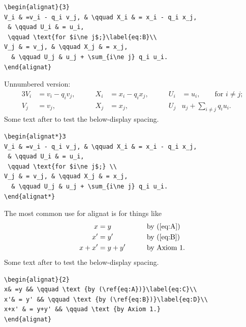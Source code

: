 \documentclass{article}
\newcommand{\ntt}{\normalfont\ttfamily}
\newcommand{\env}[1]{{\protect\ntt#1}}
\theoremstyle{definition}
\theoremstyle{remark}
\begin{document}
\begin{verbatim}
\begin{alignat}{3}
V_i & =v_i - q_i v_j, & \qquad X_i & = x_i - q_i x_j,
 & \qquad U_i & = u_i,
 \qquad \text{for $i\ne j$;}\label{eq:B}\\
V_j & = v_j, & \qquad X_j & = x_j,
  & \qquad U_j & u_j + \sum_{i\ne j} q_i u_i.
\end{alignat}
\end{verbatim}

Unnumbered version:
\begin{alignat*}3
V_i & =v_i - q_i v_j, & \qquad X_i & = x_i - q_i x_j,
 & \qquad U_i & = u_i,
 \qquad \text{for $i\ne j$;} \\
V_j & = v_j, & \qquad X_j & = x_j,
  & \qquad U_j & u_j + \sum_{i\ne j} q_i u_i.
\end{alignat*}
Some text after to test the below-display spacing.

\begin{verbatim}
\begin{alignat*}3
V_i & =v_i - q_i v_j, & \qquad X_i & = x_i - q_i x_j,
 & \qquad U_i & = u_i,
 \qquad \text{for $i\ne j$;} \\
V_j & = v_j, & \qquad X_j & = x_j,
  & \qquad U_j & u_j + \sum_{i\ne j} q_i u_i.
\end{alignat*}
\end{verbatim}

\newpage
The most common use for \env{alignat} is for things like
\begin{alignat}{2}
x& =y && \qquad \text {by (\ref{eq:A})}\label{eq:C}\\
x'& = y' && \qquad \text {by (\ref{eq:B})}\label{eq:D}\\
x+x' & = y+y' && \qquad \text {by Axiom 1.}
\end{alignat}
Some text after to test the below-display spacing.

\begin{verbatim}
\begin{alignat}{2}
x& =y && \qquad \text {by (\ref{eq:A})}\label{eq:C}\\
x'& = y' && \qquad \text {by (\ref{eq:B})}\label{eq:D}\\
x+x' & = y+y' && \qquad \text {by Axiom 1.}
\end{alignat}
\end{verbatim}

\newpage
\end{document}
